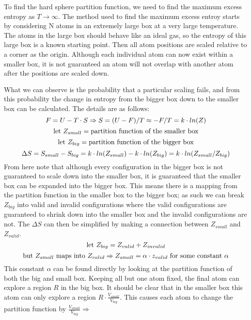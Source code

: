 To find the hard sphere partition function, we need to find the maximum excess entropy as $T\to\infty$. The method used to find the maximum excess entroy starts by considering N atoms in an extremely large box at a very large temperature. The atoms in the large box should behave like an ideal gas, so the entropy of this large box is a known starting point. Then all atom positions are scaled relative to a corner as the origin. Although each individual atom can now exist within a smaller box, it is not guaranteed an atom will not overlap with another atom after the positions are scaled down.

What we can observe is the probability that a particular scaling fails, and from this probability the change in entropy from the bigger box down to the smaller box can be calculated. The details are as follows:
$$\newline F=U-T\cdot S \Rightarrow  S=(U-F)/T\approx -F/T=k\cdot ln(Z)$$
$$\text{let }Z_{small}=\text{partition function of the smaller box}\newline$$
$$\text{let }Z_{big}=\text{partition function of the bigger box}\newline$$
$$\Delta S=S_{small}-S_{big}=k\cdot ln(Z_{small})-k\cdot ln(Z_{big})=k\cdot ln(Z_{small}/Z_{big})\newline$$
From here note that although every configuration in the bigger box is not guaranteed to scale down into the smaller box, it is guaranteed that the smaller box can be expanded into the bigger box. This means there is a mapping from the partition function in the smaller box to the bigger box; as such we can break $Z_{big}$ into valid and invalid configurations where the valid configurations are guaranteed to shrink down into the smaller box and the invalid configurations are not. The $\Delta S$ can then be simplified by making a connection between $Z_{small}$ and $Z_{valid}$.
$$\newline \text{let }Z_{big}=Z_{valid}+Z_{invalid}\newline$$
$$\text{but }Z_{small}\text{ maps into }Z_{valid} \Rightarrow Z_{small}=\alpha\cdot z_{valid}\text{ for some constant } \alpha\newline$$
This constant $\alpha$ can be found directly by looking at the partition function of both the big and small box. Keeping all but one atom fixed, the final atom can explore a region $R$ in the big box. It should be clear that in the smaller box this atom can only explore a region $R\cdot \frac{V_{small}}{V_{big}}$. This causes each atom to change the partition function by $\frac{V_{small}}{V_{big}} \Rightarrow$
